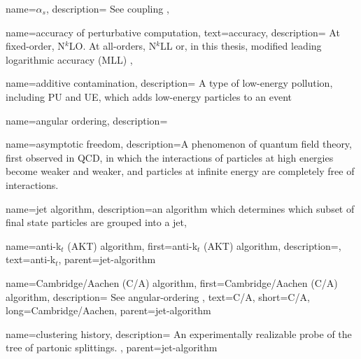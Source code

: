 
{
  name=\ensuremath{\alpha_s},
  description={
      See coupling
  },
}


{
  name=accuracy of perturbative computation,
  text=accuracy,
  description={
      At fixed-order, N\(^k\)LO.
      At all-orders, N\(^k\)LL or, in this thesis, modified leading logarithmic accuracy (MLL)
  },
}


{
    name=additive contamination,
    description={
        A type of low-energy pollution, including PU and UE, which adds low-energy particles to an event
    }
}

{
    name=angular ordering,
    description={
    }
}

{
    name=asymptotic freedom,
    description={A phenomenon of quantum field theory, first observed in QCD, in which the interactions of particles at high energies become weaker and weaker, and particles at infinite energy are completely free of interactions.}
}



{
    name=jet algorithm,
    description={an algorithm which determines which subset of final state particles are grouped into a jet},
}

    {
        name=anti-k\(_t\) (AKT) algorithm,
        first={anti-k\(_t\) (AKT) algorithm},
        description={},
        text={anti-k\(_t\)},
        parent=jet-algorithm
    }

    {
        name=Cambridge/Aachen (C/A) algorithm,
        first={Cambridge/Aachen (C/A) algorithm},
        description={
            See angular-ordering
        },
        text={C/A},
        short={C/A},
        long={Cambridge/Aachen},
        parent=jet-algorithm
    }

    {
        name=clustering history,
        description={
            An experimentally realizable probe of the tree of partonic splittings.
        },
        parent=jet-algorithm
    }

